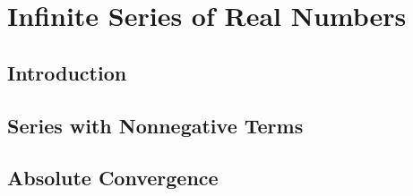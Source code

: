 \setcounter{chapter}{5}
\chapter{Infinite Series of Real Numbers}
\thispagestyle{empty}
\newpage
\section{Introduction}

\setcounter{Exercise}{3}


\vspace{12pt}

\setcounter{Exercise}{6}


\vspace{12pt}

\setcounter{Exercise}{8}


\vspace{12pt}

\setcounter{Exercise}{11}



\section{Series with Nonnegative Terms}



\vspace{12pt}



\vspace{12pt}



\vspace{12pt}

\setcounter{Exercise}{4}


\vspace{12pt}

\setcounter{Exercise}{6}


\vspace{12pt}

\setcounter{Exercise}{8}



\section{Absolute Convergence}

